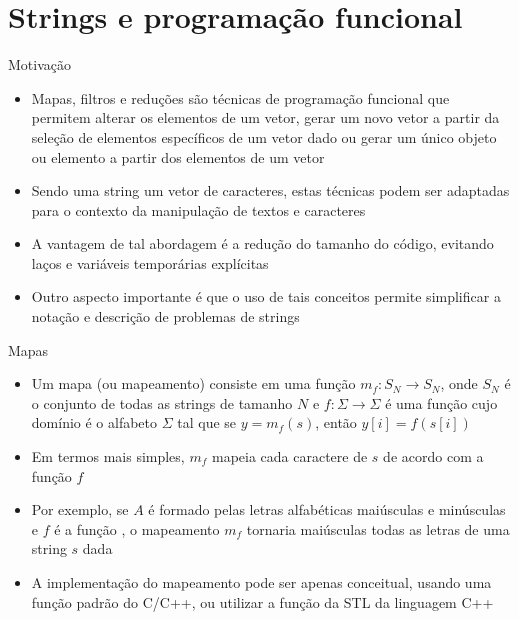 \section{Strings e programação funcional}

\begin{frame}[fragile]{Motivação}

    \begin{itemize}
        \item Mapas, filtros e reduções são técnicas de programação funcional que permitem alterar os elementos de um vetor, gerar um novo vetor a partir da seleção de elementos específicos de um vetor dado ou gerar um único objeto ou elemento a partir dos elementos de um vetor
        \pause

        \item Sendo uma string um vetor de caracteres, estas técnicas podem ser adaptadas para o contexto da manipulação de textos e caracteres
        \pause

        \item A vantagem de tal abordagem é a redução do tamanho do código, evitando laços e
            variáveis temporárias explícitas
        \pause

        \item Outro aspecto importante é que o uso de tais conceitos permite simplificar a
            notação e descrição de problemas de strings
    \end{itemize}

\end{frame}

\begin{frame}[fragile]{Mapas}

    \begin{itemize}
        \item Um mapa (ou mapeamento) consiste em uma função $m_f: S_N \to S_N$, 
            onde $S_N$ é o conjunto de todas as strings de tamanho $N$ e $f: \Sigma \to \Sigma$ é uma função 
            cujo domínio é o alfabeto $\Sigma$ tal que se $y = m_f(s)$, então $y[i] = f(s[i])$
        \pause

        \item Em termos mais simples, $m_f$ mapeia cada caractere de $s$ de acordo com a função $f$
        \pause

        \item Por exemplo, se $A$ é formado pelas letras alfabéticas maiúsculas e minúsculas e 
            $f$ é a função , o mapeamento $m_f$ tornaria maiúsculas todas as 
            letras de uma string $s$ dada
        \pause

        \item A implementação do mapeamento pode ser apenas conceitual, usando uma função padrão
            do C/C++, ou utilizar a função  da STL da linguagem C++
    \end{itemize}

\end{frame}

